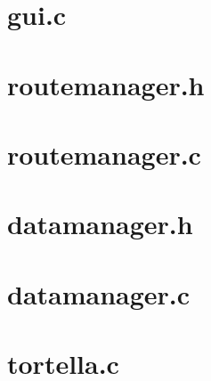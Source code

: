 \section{gui.c}

\pagebreak
\section{routemanager.h}

\pagebreak
\section{routemanager.c}

\pagebreak
\section{datamanager.h}

\pagebreak
\section{datamanager.c}

\pagebreak
\section{tortella.c}

